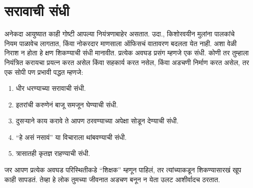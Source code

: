 \section*{सरावाची संधी}
अनेकदा आयुष्यात काही गोष्टी आपल्या नियंत्रणाबाहेर असतात. उदा., किशोरवयीन मुलांना पालकांचे नियम पाळावेच लागतात, किंवा नोकरदार माणसाला ऑफिसचं वातावरण बदलता येत नाही. अशा वेळी निराश न होता हे क्षण शिकण्याची संधी मानावीत.
प्रत्येक अवघड प्रसंग म्हणजे एक संधी. कोणी तर तुम्हाला नियंत्रित करायचा प्रयत्न करत असेल किंवा सहकार्य करत नसेल, किंवा अडचणी निर्माण करत असेल, तर एक सोपी पण प्रभावी पद्धत म्हणजे:
\begin{enumerate}
 \item धीर धरण्याच्या सरावाची संधी.
 \item इतरांची करुणेनं बाजू समजून घेण्याची संधी.
 \item दुसऱ्याने काय करावे ते आपण ठरवण्याच्या अपेक्षा सोडून देण्याची संधी.
 \item “हे असं नसावं” या विचाराला थांबवण्याची संधी.
 \item त्रासातही कृतज्ञ राहण्याची संधी.
\end{enumerate}
जर आपण प्रत्येक अवघड परिस्थितीकडे “शिक्षक” म्हणून पाहिलं, तर त्यांच्याकडून शिकण्यासारखं खूप काही सापडतं. तेव्हा हे लोक तुमच्या जीवनात अडचण बनून न येता उलट आशीर्वादच ठरतात.
